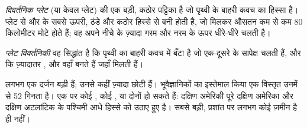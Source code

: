 \begin{definition}[विवर्तनिक प्लेट]\label{def:g7:plate-tectonics:plate}
\emph{विवर्तनिक प्लेट} (या केवल प्लेट)  की एक
बड़ी, कठोर पट्टिका है जो पृथ्वी के बाहरी कवच का हिस्सा है। प्लेट  से
और  के सबसे ऊपरी, ठंडे और कठोर हिस्से से बनी होती है, जो मिलकर औसतन
कम से कम 80 किलोमीटर मोटे होते हैं; वह अपने नीचे के ज़्यादा गरम और नरम
 के ऊपर धीरे-धीरे चलती है।
\end{definition}

\begin{definition}[प्लेट विवर्तनिकी]\label{def:g7:plate-tectonics:plate-tectonics}
\emph{प्लेट विवर्तनिकी} वह सिद्धांत है कि पृथ्वी का
बाहरी कवच  में बँटा है जो एक-दूसरे के सापेक्ष चलती हैं, और कि
ज़्यादातर ,  और  वहाँ बनते हैं जहाँ 
मिलती हैं।
\end{definition}

\begin{remark}[कितनी प्लेटें?]\label{rem:g7:plate-tectonics:how-many}
लगभग एक दर्जन  बड़ी हैं; उनसे कहीं ज़्यादा छोटी हैं। भूवैज्ञानिकों का
इस्तेमाल किया एक विस्तृत  उनमें से 52 गिनता है। एक  पर कोई
, कोई , या दोनों हो सकते हैं: दक्षिण अमेरिकी  पूरे दक्षिण
अमेरिका और दक्षिण अटलांटिक  के पश्चिमी आधे हिस्से को उठाए हुए है। सबसे
बड़ी, प्रशांत  पर लगभग कोई ज़मीन है ही नहीं।
\end{remark}

